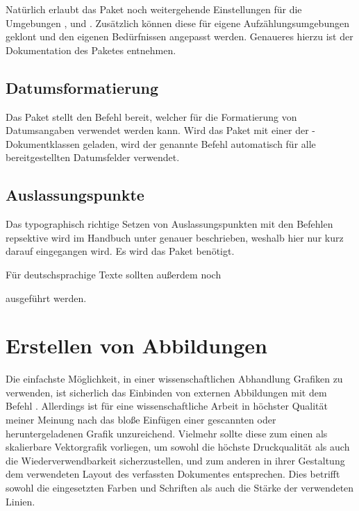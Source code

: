 \documentclass[%
  english,ngerman,%
  geometry=no,DIV=12,automark,%
]{tudscrartcl}
\begin{document}
Natürlich erlaubt das Paket noch weitergehende Einstellungen für die Umgebungen 
,  und . 
Zusätzlich können diese für eigene Aufzählungsumgebungen geklont und den 
eigenen Bedürfnissen angepasst werden. Genaueres hierzu ist der Dokumentation 
des Paketes  entnehmen.


\subsection{Datumsformatierung}
Das Paket  stellt den Befehl  bereit, welcher 
für die Formatierung von Datumsangaben verwendet werden kann. Wird das Paket 
mit einer der \TUDScript-Dokumentklassen geladen, wird der genannte Befehl 
automatisch für alle bereitgestellten Datumsfelder verwendet.
%
\begin{Preamble}
\usepackage{isodate}

\end{Preamble}


\subsection{Auslassungspunkte}
Das typographisch richtige Setzen von Auslassungspunkten mit den Befehlen 
 repsektive  wird im Handbuch unter 
 genauer 
beschrieben, weshalb hier nur kurz darauf eingegangen wird. Es wird das Paket 
 benötigt.
%
\begin{Preamble}
\usepackage{ellipsis}
\end{Preamble}
%
Für deutschsprachige Texte sollten außerdem noch 
%
\begin{Preamble}
\let\ellipsispunctuation\relax
\end{Preamble}
%
ausgeführt werden.



\section{Erstellen von Abbildungen}
\label{sec:figures}
Die einfachste Möglichkeit, in einer wissenschaftlichen Abhandlung Grafiken zu 
verwenden, ist sicherlich das Einbinden von externen Abbildungen mit dem Befehl 
. Allerdings ist für eine wissenschaftliche Arbeit in 
höchster Qualität meiner Meinung nach das bloße Einfügen einer gescannten oder 
heruntergeladenen Grafik unzureichend. Vielmehr sollte diese zum einen als 
skalierbare Vektorgrafik vorliegen, um sowohl die höchste Druckqualität als 
auch die Wiederverwendbarkeit sicherzustellen, und zum anderen in ihrer 
Gestaltung dem verwendeten Layout des verfassten Dokumentes entsprechen. Dies 
betrifft sowohl die eingesetzten Farben und Schriften als auch die Stärke der 
verwendeten Linien.
\end{document}
